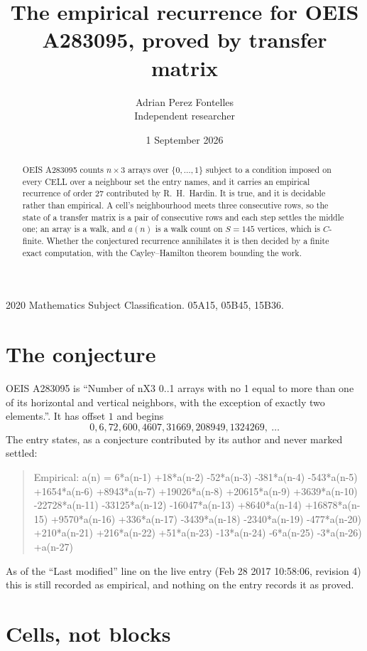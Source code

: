 \documentclass[11pt,a4paper]{article}
\title{The empirical recurrence for OEIS A283095, proved by transfer matrix}
\author{Adrian Perez Fontelles\\ \small Independent researcher}
\date{1 September 2026}
\theoremstyle{plain}
\theoremstyle{definition}
\begin{document}
\maketitle

\begin{abstract}
OEIS A283095 counts $n\times3$ arrays over $\{0,\dots,1\}$ subject to a condition imposed on
every CELL over a neighbour set the entry names, and it carries an empirical recurrence of
order $27$ contributed by R.~H.~Hardin. It is true, and it is decidable rather than
empirical. A cell's neighbourhood meets three consecutive rows, so the state of a transfer
matrix is a pair of consecutive rows and each step settles the middle one; an array is a
walk, and $a(n)$ is a walk count on $S=145$ vertices, which is $C$-finite. Whether the
conjectured recurrence annihilates it is then decided by a finite exact computation, with the
Cayley--Hamilton theorem bounding the work.
\end{abstract}

\noindent\small 2020 Mathematics Subject Classification. 05A15, 05B45, 15B36.\normalsize

\section{The conjecture}

OEIS A283095 is ``Number of nX3 0..1 arrays with no 1 equal to more than one of its horizontal and vertical neighbors, with the exception of exactly two elements.''. It has offset $1$ and begins
\[
0, 6, 72, 600, 4607, 31669, 208949, 1324269,\ \dots
\]
The entry states, as a conjecture contributed by its author and never marked settled:
\begin{quote}
Empirical: a(n) = 6*a(n-1) +18*a(n-2) -52*a(n-3) -381*a(n-4) -543*a(n-5) +1654*a(n-6) +8943*a(n-7) +19026*a(n-8) +20615*a(n-9) +3639*a(n-10) -22728*a(n-11) -33125*a(n-12) -16047*a(n-13) +8640*a(n-14) +16878*a(n-15) +9570*a(n-16) +336*a(n-17) -3439*a(n-18) -2340*a(n-19) -477*a(n-20) +210*a(n-21) +216*a(n-22) +51*a(n-23) -13*a(n-24) -6*a(n-25) -3*a(n-26) +a(n-27)
\end{quote}
As of the ``Last modified'' line on the live entry (Feb 28 2017 10:58:06, revision 4) this is still
recorded as empirical, and nothing on the entry records it as proved.

\section{Cells, not blocks}
\end{document}
